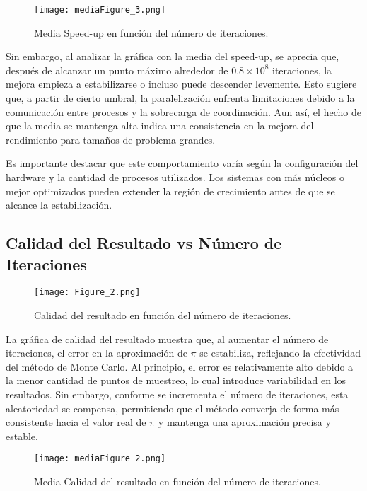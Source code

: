 \documentclass[conference, a4paper]{IEEEtran}
\begin{document}
\begin{figure}[H]
    \centering
    \texttt{[image: mediaFigure\_3.png]}
    \caption{Media Speed-up en función del número de iteraciones.}
    \label{fig:speedupMedia}
\end{figure}

Sin embargo, al analizar la gráfica con la media del speed-up, se aprecia que, después de alcanzar un punto máximo alrededor de \(0.8 \times 10^8\) iteraciones, la mejora empieza a estabilizarse o incluso puede descender levemente. Esto sugiere que, a partir de cierto umbral, la paralelización enfrenta limitaciones debido a la comunicación entre procesos y la sobrecarga de coordinación. Aun así, el hecho de que la media se mantenga alta indica una consistencia en la mejora del rendimiento para tamaños de problema grandes.

Es importante destacar que este comportamiento varía según la configuración del hardware y la cantidad de procesos utilizados. Los sistemas con más núcleos o mejor optimizados pueden extender la región de crecimiento antes de que se alcance la estabilización. 

\subsection{Calidad del Resultado vs Número de Iteraciones}
\begin{figure}[H]
    \centering
    \texttt{[image: Figure\_2.png]}
    \caption{Calidad del resultado en función del número de iteraciones.}
    \label{fig:calidad}
\end{figure}

La gráfica de calidad del resultado muestra que, al aumentar el número de iteraciones, el error en la aproximación de \(\pi\) se estabiliza, reflejando la efectividad del método de Monte Carlo. Al principio, el error es relativamente alto debido a la menor cantidad de puntos de muestreo, lo cual introduce variabilidad en los resultados. Sin embargo, conforme se incrementa el número de iteraciones, esta aleatoriedad se compensa, permitiendo que el método converja de forma más consistente hacia el valor real de \(\pi\) y mantenga una aproximación precisa y estable.

\begin{figure}[H]
    \centering
    \texttt{[image: mediaFigure\_2.png]}
    \caption{Media Calidad del resultado en función del número de iteraciones.}
    \label{fig:calidad}
\end{figure}
\end{document}
